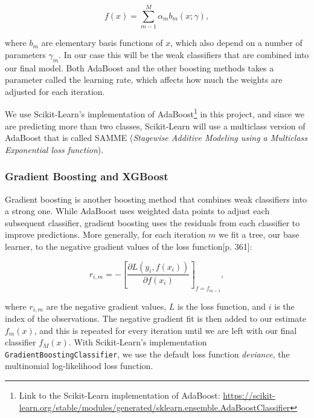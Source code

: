 \begin{equation}
    f(x) = \sum_{m-1}^M \alpha_m b_m (x; \gamma),
\end{equation}

where $b_m$ are elementary basis functions of $x$, which also depend on a number of parameters $\gamma_m$. In our case this will be the weak classifiers that are combined into our final model. Both AdaBoost and the other boosting methods takes a parameter called the learning rate, which affects how much the weights are adjusted for each iteration.

We use Scikit-Learn's implementation of AdaBoost\footnote{Link to the Scikit-Learn implementation of AdaBoost: \url{https://scikit-learn.org/stable/modules/generated/sklearn.ensemble.AdaBoostClassifier}} in this project, and since we are predicting more than two classes, Scikit-Learn will use a multiclass version of AdaBoost that is called SAMME (\textit{Stagewise Additive Modeling using a Multiclass Exponential loss function}).


\subsubsection{Gradient Boosting and XGBoost}

Gradient boosting is another boosting method that combines weak classifiers into a strong one. While AdaBoost uses weighted data points to adjust each subsequent classifier, gradient boosting uses the residuals from each classifier to improve predictions. More generally, for each iteration $m$ we fit a tree, our base learner, to the negative gradient values of the loss function\cite{hastie}[p. 361]:

\begin{equation}
    r_{i,m} = - \left[\frac{\partial L(y_i, f(x_i))}{\partial f(x_i)}\right]_{f=f_{m-1}},
\end{equation}


where $r_{i,m}$ are the negative gradient values, $L$ is the loss function, and $i$ is the index of the observations. The negative gradient fit is then added to our estimate $f_m(x)$, and this is repeated for every iteration until we are left with our final classifier $f_M(x)$. With Scikit-Learn's implementation \texttt{GradientBoostingClassifier}, we use the default loss function \textit{deviance}, the multinomial log-likelihood loss function.

